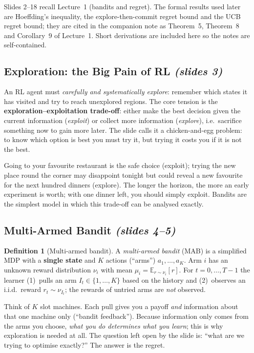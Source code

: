 \documentclass[11pt,a4paper]{article}
\newcommand{\E}{\mathbb{E}}
\newcommand{\slides}[1]{\emph{(slides #1)}}
\theoremstyle{plain}
\theoremstyle{definition}
\newtheorem{definition}[theorem]{Definition}
\theoremstyle{remark}
\begin{document}
Slides 2--18 recall Lecture~1 (bandits and regret). The formal results used later are
Hoeffding's inequality, the explore-then-commit regret bound and the UCB regret bound; they are cited in the
companion note as Theorem~5, Theorem~8 and Corollary~9 of Lecture~1. Short derivations are included here so the
notes are self-contained.

\subsection{Exploration: the Big Pain of RL \slides{3}}

An RL agent must \emph{carefully and systematically explore}: remember which states it has visited and try to
reach unexplored regions. The core tension is the \textbf{exploration--exploitation trade-off}: either make the
best decision given the current information (\emph{exploit}) or collect more information (\emph{explore}),
i.e.\ sacrifice something now to gain more later. The slide calls it a chicken-and-egg problem: to know which
option is best you must try it, but trying it costs you if it is not the best.

\begin{intuition}
Going to your favourite restaurant is the safe choice (exploit); trying the new place round the corner may
disappoint tonight but could reveal a new favourite for the next hundred dinners (explore). The longer the
horizon, the more an early experiment is worth; with one dinner left, you should simply exploit. Bandits are
the simplest model in which this trade-off can be analysed exactly.
\end{intuition}

\subsection{Multi-Armed Bandit \slides{4--5}}

\begin{definition}[Multi-armed bandit]
A \emph{multi-armed bandit} (MAB) is a simplified MDP with a \textbf{single state} and $K$ actions (``arms'')
$a_1,\dots,a_K$. Arm $i$ has an unknown reward distribution $\nu_i$ with mean $\mu_i=\E_{r\sim\nu_i}[r]$.
For $t=0,\dots,T-1$ the learner (1)~pulls an arm $I_t\in\{1,\dots,K\}$ based on the history and (2)~observes an
i.i.d.\ reward $r_t\sim\nu_{I_t}$; the rewards of untried arms are \emph{not} observed.
\end{definition}

\begin{intuition}
Think of $K$ slot machines. Each pull gives you a payoff \emph{and} information about that one machine only
(``bandit feedback''). Because information only comes from the arms you choose, \emph{what you do determines
what you learn}; this is why exploration is needed at all. The question left open by the slide is: ``what are we
trying to optimise exactly?'' The answer is the regret.
\end{intuition}
\end{document}
